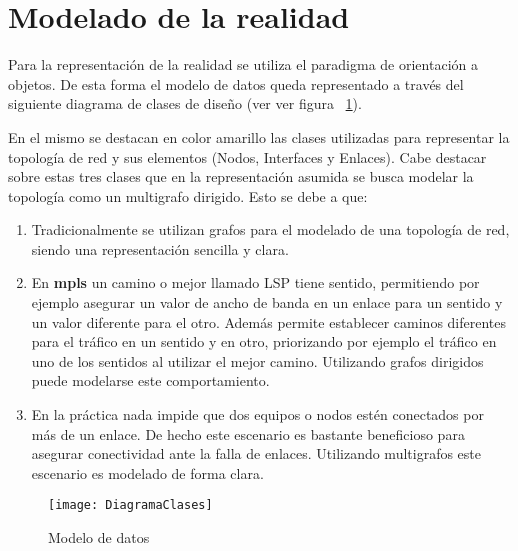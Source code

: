 
\section[Modelado de la realidad]{Modelado de la realidad}

Para la representaci\'on de la realidad se utiliza el paradigma de orientaci\'on a objetos. De esta forma el modelo de datos queda representado a través del siguiente diagrama de clases de diseño (ver ver figura ~\ref{fig:ModeloDeDatos}).

En el mismo se destacan en color amarillo las clases utilizadas para representar la topolog\'ia de red y sus elementos (Nodos, Interfaces y Enlaces). Cabe destacar sobre estas tres clases que en la representaci\'on asumida se busca modelar la topolog\'ia como un multigrafo dirigido. Esto se debe a que:

\begin{enumerate}
\item Tradicionalmente se utilizan grafos para el modelado de una topolog\'ia de red, siendo una representaci\'on sencilla y clara.

\item En \textbf{mpls} un camino o mejor llamado LSP tiene sentido, permitiendo por ejemplo asegurar un valor de ancho de banda en un enlace para un sentido y un valor diferente para el otro. Adem\'as permite establecer caminos diferentes para el tr\'afico en un sentido y en otro, priorizando por ejemplo el tr\'afico  en uno de los sentidos al utilizar el mejor camino. Utilizando grafos dirigidos puede modelarse este comportamiento.

\item En la pr\'actica nada impide que dos equipos o nodos est\'en conectados por m\'as de un enlace. De hecho este escenario es bastante beneficioso para asegurar conectividad ante la falla de enlaces. Utilizando multigrafos este escenario es modelado de forma clara.
  
\end{enumerate}

\begin{figure}[ht!] 
\centering    
\texttt{[image: DiagramaClases]}
\caption[Modelo de datos]{Modelo de datos}
\label{fig:ModeloDeDatos}
\end{figure}

